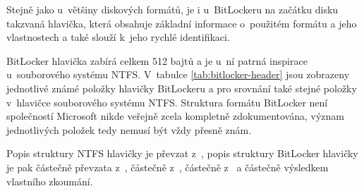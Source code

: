 \label{sec:header}

Stejně jako u~většiny diskových formátů, je i u~BitLockeru na začátku disku takzvaná hlavička, která obsahuje základní informace o~použitém formátu a jeho vlastnostech a také slouží k~jeho rychlé identifikaci.

BitLocker hlavička zabírá celkem 512 bajtů a je u~ní patrná inspirace u~souborového systému NTFS. V~tabulce \ref{tab:bitlocker-header} jsou zobrazeny jednotlivé známé položky hlavičky BitLockeru a pro srovnání také stejné položky v~hlavičce souborového systému NTFS. Struktura formátu BitLocker není společností Microsoft nikde veřejně zcela kompletně zdokumentována, význam jednotlivých položek tedy nemusí být vždy přesně znám.

Popis struktury NTFS hlavičky je převzat z~\cite{Carrier2005}, popis struktury BitLocker hlavičky je pak částečně převzata z~\cite{Metz2011}, částečně z~\cite{Ferguson2006}, částečně z~\cite{Kornblum2009} a částečně výsledkem vlastního zkoumání.


